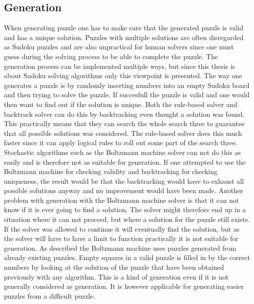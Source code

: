 \documentclass[a4paper,11pt]{kth-mag}
\begin{document}
\subsection{Generation}
When generating puzzle one has to make sure that the generated puzzle is valid and has a unique solution.
Puzzles with multiple solutions are often disregarded as Sudoku puzzles and are also unpractical for human solvers since one must guess during the solving process to be able to complete the puzzle. The generation process can be implemented multiple ways, but since this thesis is about Sudoku solving algorithms only this viewpoint is presented.
The way one generates a puzzle is by randomly inserting numbers into an empty Sudoku board and then trying to solve the puzzle. If succesfull the puzzle is valid and one would then want to find out if the solution is unique. 
Both the rule-based solver and backtrack solver can do this by backtracking even thought a solution was found. This practically means that they can search the whole search three to guarantee that all possible solutions was considered.
The rule-based solver does this much faster since it can apply logical rules to roll out some part of the search three.
Stochastic algorithms such as the Boltzmann machine solver can not do this as easily and is therefore not as suitable for generation.
If one attempted to use the Boltzmann machine for checking validity and backtracking for checking uniqueness, the result would be that the backtracking would have to exhaust all possible solutions anyway and no improvement would have been made.
Another problem with generation with the Boltzmann machine solver is that it can not know if it is ever going to find a solution.
The solver might therefore end up in a situation where it can not proceed, but where a solution for the puzzle still exists.
If the solver was allowed to continue it will eventually find the solution, but as the solver will have to have a limit to function practically it is not suitable for generation.
As described the Boltzmann machine uses puzzles generated from already existing puzzles.
Empty squares in a valid puzzle is filled in by the correct numbers by looking at the solution of the puzzle that have been obtained previously with any algorithm.
This is a kind of generation even if it is not generally considered as generation.
It is however applicable for generating easier puzzles from a difficult puzzle.
\end{document}
